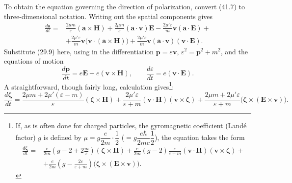 To obtain the equation governing the direction of polarization, convert (41.7) to three-dimensional notation. Writing out the spatial components gives
\[
\begin{aligned}
\frac{d\mathbf a}{dt}={}&\frac{2\mu m}{\varepsilon}(\mathbf a\times\mathbf H)
+\frac{2\mu m}{\varepsilon}(\mathbf a\cdot\mathbf v)\mathbf E
-\frac{2\mu'\varepsilon}{m}\mathbf v(\mathbf a\cdot\mathbf E)+{}\\
&+\frac{2\mu'\varepsilon}{m}\mathbf v\bigl(\mathbf v\cdot(\mathbf a\times\mathbf H)\bigr)
+\frac{2\mu'\varepsilon}{m}\mathbf v(\mathbf a\cdot\mathbf v)(\mathbf v\cdot\mathbf E).
\end{aligned}
\]
Substitute (29.9) here, using in the differentiation $\mathbf p=\varepsilon\mathbf v$, $\varepsilon^2=\mathbf p^2+m^2$, and the equations of motion
\begin{equation}
\frac{d\mathbf p}{dt}=e\mathbf E+e(\mathbf v\times\mathbf H),
\qquad
\frac{d\varepsilon}{dt}=e(\mathbf v\cdot\mathbf E).
\tag{41.8}
\end{equation}
A straightforward, though fairly long, calculation gives\footnote{If, as is often done for charged particles, the gyromagnetic coefficient (Land\'e factor) $g$ is defined by $\mu=g\dfrac e{2m}\cdot\dfrac12$ ($=g\dfrac{e\hbar}{2mc}\dfrac12$), the equation takes the form
\begin{equation}
\begin{aligned}
\frac{d\boldsymbol\zeta}{dt}={}&\frac e{2m}\left(g-2+2\frac m\varepsilon\right)(\boldsymbol\zeta\times\mathbf H)
+\frac e{2m}(g-2)\frac\varepsilon{\varepsilon+m}(\mathbf v\cdot\mathbf H)(\mathbf v\times\boldsymbol\zeta)+{}\\
&+\frac e{2m}\left(g-\frac{2\varepsilon}{\varepsilon+m}\right)
\bigl(\boldsymbol\zeta\times(\mathbf E\times\mathbf v)\bigr).
\end{aligned}
\tag{41.9a}
\end{equation}}:
\begin{equation}
\frac{d\boldsymbol\zeta}{dt}
=\frac{2\mu m+2\mu'(\varepsilon-m)}{\varepsilon}(\boldsymbol\zeta\times\mathbf H)
+\frac{2\mu'\varepsilon}{\varepsilon+m}(\mathbf v\cdot\mathbf H)(\mathbf v\times\boldsymbol\zeta)
+\frac{2\mu m+2\mu'\varepsilon}{\varepsilon+m}
\bigl(\boldsymbol\zeta\times(\mathbf E\times\mathbf v)\bigr).
\tag{41.9}
\end{equation}

